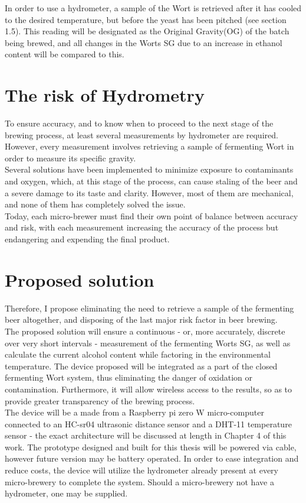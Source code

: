 \documentclass[twoside]{ctuthesis}
\theoremstyle{plain}
\theoremstyle{definition}
\theoremstyle{note}
\begin{document}
In order to use a hydrometer, a sample of the Wort is retrieved after it has cooled to the desired temperature, but before the yeast has been pitched (see section 1.5). This reading will be designated as the Original Gravity(OG) of the batch being brewed, and all changes in the Worts SG due to an increase in ethanol content will be compared to this.

\section{The risk of Hydrometry}
To ensure accuracy, and to know when to proceed to the next stage of the brewing process, at least several measurements by hydrometer are required. However, every measurement involves retrieving a sample of fermenting Wort in order to measure its specific gravity.\\
Several solutions have been implemented to minimize exposure to contaminants and oxygen, which, at this stage of the process, can cause staling of the beer and a severe damage to its taste and clarity. However, most of them are mechanical, and none of them has completely solved the issue.\\
Today, each micro-brewer must find their own point of balance between accuracy and risk, with each measurement increasing the accuracy of the process but endangering and expending the final product.



\section{Proposed solution}
Therefore, I propose eliminating the need to retrieve a sample of the fermenting beer altogether, and disposing of the last major risk factor in beer brewing.\\
The proposed solution will ensure a continuous - or, more accurately, discrete over very short intervals - measurement of the fermenting Worts SG, as well as calculate the current alcohol content while factoring in the environmental temperature. The device proposed will be integrated as a part of the closed fermenting Wort system, thus eliminating the danger of oxidation or contamination. Furthermore, it will allow wireless access to the results, so as to provide greater transparency of the brewing process.\\
The device will be a made from a Raspberry pi zero W micro-computer connected to an HC-sr04 ultrasonic distance sensor and a DHT-11 temperature sensor - the exact architecture will be discussed at length in Chapter 4 of this work. The prototype designed and built for this thesis will be powered via cable, however future version may be battery operated. In order to ease integration and reduce costs, the device will utilize the hydrometer already present at every micro-brewery to complete the system. Should a micro-brewery not have a hydrometer, one may be supplied.\\
\end{document}
